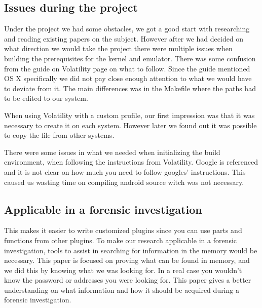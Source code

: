 \subsection{Issues during the project}
Under the project we had some obstacles, we got a good start with researching and 
reading existing papers on the subject. However after we had decided on what 
direction we would take the project there were multiple issues when building the 
prerequisites for the kernel and emulator. There was some confusion from the guide 
on Volatility page on what to follow. Since the guide mentioned OS X specifically 
we did not pay close enough attention to what we would have to deviate from it.
The main differences was in the Makefile where the paths had to be edited to our
system.

When using Volatility with a custom profile, our first impression was that it was
necessary to create it on each system. However later we found out it was possible 
to copy the file from other systems.

There were some issues in what we needed when initializing the build environment, when 
following the instructions from Volatility. Google is referenced and it is not clear 
on how much you need to follow googles’ instructions. This caused us wasting time 
on compiling android source witch was not necessary.


\subsection{Applicable in a forensic investigation}
This makes it easier to write customized plugins since you can use parts and functions from other plugins.
To make our research applicable in a forensic investigation, tools to assist in searching for information in 
the memory would be necessary. This paper is focused on proving what can be found in memory, and we did this 
by knowing what we was looking for. In a real case you wouldn't know the password or addresses you were looking for.
This paper gives a better understanding on what information and how it should be acquired during a forensic investigation.